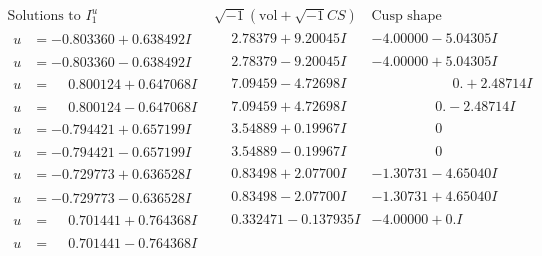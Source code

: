 \documentclass[1p]{elsarticle_modified}
\theoremstyle{definition}
\newcommand{\I}{\sqrt{-1}}
\begin{document}
$$\begin{array}{c|c|c}  
\text{Solutions to }I^u_{1}& \I (\text{vol} + \sqrt{-1}CS) & \text{Cusp shape}\\
 \hline 
\begin{aligned}
u &= -0.803360 + 0.638492 I\end{aligned}
 & \phantom{-}2.78379 + 9.20045 I & -4.00000 - 5.04305 I \\ \hline\begin{aligned}
u &= -0.803360 - 0.638492 I\end{aligned}
 & \phantom{-}2.78379 - 9.20045 I & -4.00000 + 5.04305 I \\ \hline\begin{aligned}
u &= \phantom{-}0.800124 + 0.647068 I\end{aligned}
 & \phantom{-}7.09459 - 4.72698 I & \phantom{-0.000000 -}0. + 2.48714 I \\ \hline\begin{aligned}
u &= \phantom{-}0.800124 - 0.647068 I\end{aligned}
 & \phantom{-}7.09459 + 4.72698 I & \phantom{-0.000000 } 0. - 2.48714 I \\ \hline\begin{aligned}
u &= -0.794421 + 0.657199 I\end{aligned}
 & \phantom{-}3.54889 + 0.19967 I & \phantom{-0.000000 } 0 \\ \hline\begin{aligned}
u &= -0.794421 - 0.657199 I\end{aligned}
 & \phantom{-}3.54889 - 0.19967 I & \phantom{-0.000000 } 0 \\ \hline\begin{aligned}
u &= -0.729773 + 0.636528 I\end{aligned}
 & \phantom{-}0.83498 + 2.07700 I & -1.30731 - 4.65040 I \\ \hline\begin{aligned}
u &= -0.729773 - 0.636528 I\end{aligned}
 & \phantom{-}0.83498 - 2.07700 I & -1.30731 + 4.65040 I \\ \hline\begin{aligned}
u &= \phantom{-}0.701441 + 0.764368 I\end{aligned}
 & \phantom{-}0.332471 - 0.137935 I & -4.00000 + 0. I\phantom{ +0.000000I} \\ \hline\begin{aligned}
u &= \phantom{-}0.701441 - 0.764368 I\end{aligned}

\end{array}$$
\end{document}
